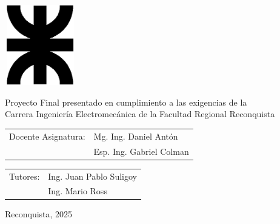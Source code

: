 \thispagestyle{toc}

\begin{center}
	\vspace*{2cm}
	\includegraphics[width=31mm,height=35mm]{imagenes/LogoUTN_nvgsb.eps}
\end{center}	
	\vspace{3cm}
	

		\begin{adjustwidth}{3cm}{0cm}
			\hspace*{1.27cm}Proyecto Final presentado en cumplimiento a las exigencias de la\\ Carrera Ingeniería Electromecánica de la Facultad Regional Reconquista\\
		\end{adjustwidth}

	
	

\vspace{7.5cm}

	\begin{tabular}{@{}p{}p{}@{}}
		Docente Asignatura: & Mg. Ing. Daniel Antón\\
							& Esp. Ing. Gabriel Colman
	\end{tabular}
	
	\begin{tabular}{@{}p{}p{}@{}}
			Tutores: & Ing. Juan Pablo Suligoy \\
					  & Ing. Mario Ross
	\end{tabular}


\vfill

\begin{center}\begin{large}
		Reconquista, 2025
\end{large}\end{center}
